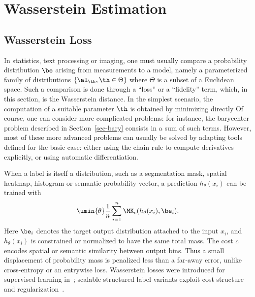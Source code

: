 

\chapter{Wasserstein Estimation}


\section{Wasserstein Loss}

In statistics, text processing or imaging, one must usually compare a probability distribution $\be$ arising from measurements to a model, namely a parameterized family of distributions $\{\al_\th,\th\in\Theta\}$ where $\Theta$ is a subset of a Euclidean space. Such a comparison is done through a ``loss'' or a ``fidelity'' term, which, in this section, is the Wasserstein distance.
%
In the simplest scenario, the computation of a suitable parameter $\th$ is obtained by minimizing directly
Of course, one can consider more complicated problems: for instance, the barycenter problem described in Section~\ref{sec-bary} consists in a sum of such terms. However, most of these more advanced problems can usually be solved by adapting tools defined for the basic case: either using the chain rule to compute derivatives explicitly, or using automatic differentiation. %

\begin{example}\label{ex-structured-prediction-wasserstein-loss}
	When a label is itself a distribution, such as a segmentation mask, spatial heatmap, histogram or semantic probability vector, a prediction \(h_\theta(x_i)\) can be trained with
	\[
		\umin{\theta}\frac1n\sum_{i=1}^n \MK_c(h_\theta(x_i),\be_i).
	\]
	Here \(\be_i\) denotes the target output distribution attached to the input \(x_i\), and \(h_\theta(x_i)\) is constrained or normalized to have the same total mass. The cost \(c\) encodes spatial or semantic similarity between output bins. Thus a small displacement of probability mass is penalized less than a far-away error, unlike cross-entropy or an entrywise loss. Wasserstein losses were introduced for supervised learning in~\cite{FrognerNIPS}; scalable structured-label variants exploit cost structure and regularization~\cite{ToyokuniYokoiKashimaYamada2021WassersteinStructuredLabels}.
\end{example}

